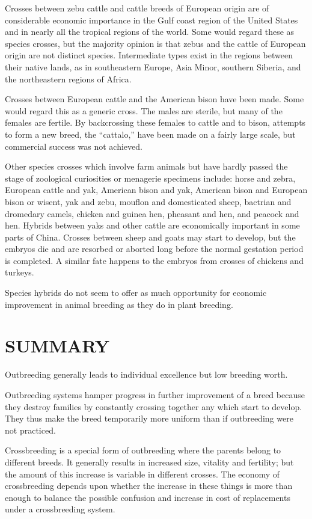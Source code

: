 Crosses between zebu cattle and cattle breeds of European origin
are of considerable economic importance in the Gulf coast region of the
United States and in nearly all the tropical regions of the world. Some
would regard these as species crosses, but the majority opinion is that
zebus and the cattle of European origin are not distinct species.
Intermediate types exist in the regions between their native lands, as in
southeastern Europe, Asia Minor, southern Siberia, and the northeastern
regions of Africa.

Crosses between European cattle and the American bison have been
made. Some would regard this as a generic cross. The males are sterile,
but many of the females are fertile. By backcrossing these females to
cattle and to bison, attempts to form a new breed, the ``cattalo,'' have
been made on a fairly large scale, but commercial success was not
achieved.

Other species crosses which involve farm animals but have hardly
passed the stage of zoological curiosities or menagerie specimens
include: horse and zebra, European cattle and yak, American bison and
yak, American bison and European bison or wisent, yak and zebu,
mouflon and domesticated sheep, bactrian and dromedary camels,
chicken and guinea hen, pheasant and hen, and peacock and hen.
Hybrids between yaks and other cattle are economically important in
some parts of China. Crosses between sheep and goats may start to
develop, but the embryos die and are resorbed or aborted long before
the normal gestation period is completed. A similar fate happens to the
embryos from crosses of chickens and turkeys.

Species hybrids do not seem to offer as much opportunity for economic
improvement in animal breeding as they do in plant breeding.

\section*{SUMMARY}

Outbreeding generally leads to individual excellence but low breeding
worth.

Outbreeding systems hamper progress in further improvement of a
breed because they destroy families by constantly crossing together any
which start to develop. They thus make the breed temporarily more
uniform than if outbreeding were not practiced.

Crossbreeding is a special form of outbreeding where the parents
belong to different breeds. It generally results in increased size, vitality
and fertility; but the amount of this increase is variable in different
crosses. The economy of crossbreeding depends upon whether the
increase in these things is more than enough to balance the possible
confusion and increase in cost of replacements under a crossbreeding
system.

